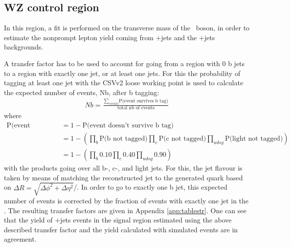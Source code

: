 \subsection{WZ control region}
In this region, a fit is performed on the transverse mass of the \PW\ boson, in order to estimate the nonprompt  lepton yield coming from \DY+jets and the \WZ+jets backgrounds. 

A transfer factor has to be used to account for going from a region with 0 b jets to a region with exactly one jet, or at least one jets. For this the probability of tagging at least one jet with the CSVv2 loose working point is used to calculate the expected number of events, Nb, after b tagging: 
\begin{align}
	Nb = \frac{\sum_{events}\text{P(event survives b tag)}}{\text{total nb of events}}
\end{align}
where 
\begin{align}
	\text{P(event survives b tag )} &= 1 - \text{P(event doesn't survive b tag)}\\
	& = 1 - \left(\prod_{b} \text{P(b not tagged)} \prod_{c} \text{P(c not tagged)} \prod_{udsg} \text{P(light not tagged)}\right)\\
	& = 1 - \left(\prod_{b} 0.10 \prod_{c} 0.40 \prod_{udsg} 0.90\right)
\end{align}
with the products going over all b-, c-, and light jets. For this, the jet flavour is taken by means of matching the reconstructed jet to the generated quark based on $\Delta R = \sqrt{\Delta \phi^2 + \Delta \eta^2}$/.  
In order to go to exactly one b jet, this expected number of events is corrected by the fraction of events with exactly  one jet in the \WZCR. The resulting transfer factors are given in Appendix \ref{app:tablestr}. One can see  that the yield of \WZ+jets events in the signal region estimated using the above described transfer factor and the yield calculated with simulated events are in agreement. 

